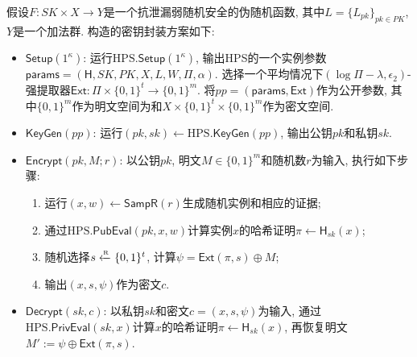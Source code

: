 \begin{construction}[基于PEPRFs的KEM方案]
假设$F: SK \times X \rightarrow Y$是一个抗泄漏弱随机安全的伪随机函数, 其中$L = \{L_{pk}\}_{pk \in PK}$, $Y$是一个加法群. 构造的密钥封装方案如下:
\begin{itemize}
\item $\mathsf{Setup}(1^\kappa)$: 运行$\text{HPS}.\mathsf{Setup}(1^\kappa)$, 输出HPS的一个实例参数$\mathsf{params} = (\mathsf{H}, SK, PK, X, L, W, \Pi, \alpha)$. 选择一个平均情况下$(\log\Pi-\lambda, \epsilon_2)$-强提取器$\mathsf{Ext}: \Pi\times\{0, 1\}^t\rightarrow\{0, 1\}^m$. 将$pp = (\mathsf{params}, \mathsf{Ext})$作为公开参数, 其中$\{0, 1\}^m$作为明文空间为和$X \times \{0, 1\}^t \times \{0, 1\}^m$作为密文空间.

\item $\mathsf{KeyGen}(pp)$: 运行$(pk, sk) \leftarrow \text{HPS}.\mathsf{KeyGen}(pp)$, 输出公钥$pk$和私钥$sk$. 
  
\item $\mathsf{Encrypt}(pk, M; r)$: 以公钥$pk$, 明文$M \in \{0, 1\}^m$和随机数$r$为输入, 执行如下步骤:
\begin{enumerate}
    \item 运行$(x, w) \leftarrow \mathsf{SampR}(r)$生成随机实例和相应的证据;
    \item 通过$\text{HPS}.\mathsf{PubEval}(pk, x, w)$计算实例$x$的哈希证明$\pi \leftarrow \mathsf{H}_{sk}(x)$; 
    \item 随机选择$s \xleftarrow{\textup{\tiny R}} \{0, 1\}^t$, 计算$\psi=\mathsf{Ext}(\pi, s)\oplus M$;
    \item 输出$(x, s, \psi)$作为密文$c$. 
\end{enumerate} 

\item $\mathsf{Decrypt}(sk, c)$: 以私钥$sk$和密文$c = (x, s, \psi)$为输入, 通过$\text{HPS}.\mathsf{PrivEval}(sk, x)$计算$x$的哈希证明$\pi \leftarrow \mathsf{H}_{sk}(x)$, 再恢复明文$M':= \psi\oplus\mathsf{Ext}(\pi, s)$.
\end{itemize}
\end{construction}












